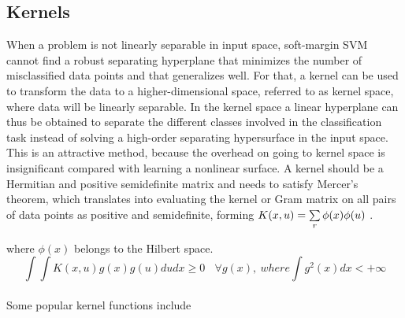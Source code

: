 \subsection{Kernels}

When a problem is not linearly separable in input space, soft-margin SVM cannot find a robust separating
hyperplane that minimizes the number of misclassified data points and that generalizes well. For that, a kernel can be used to transform the data to a higher-dimensional space, referred to as kernel space, where data will be linearly separable. In the kernel space a linear hyperplane can thus be obtained to separate the different classes involved in the classification task instead of solving a high-order separating hypersurface in the input space. This is an attractive method, because the overhead on going to kernel space is insignificant compared with learning a nonlinear surface. A kernel should be a Hermitian and positive semidefinite matrix and needs to satisfy Mercer’s theorem, which translates into evaluating the kernel or Gram matrix on all pairs of data points as positive and semidefinite, forming
\newline 
\newline
$K(\small{x,u})=\sum\limits_{r} \phi(x)\phi(u) $ .

where $\phi(x) $ belongs to the Hilbert space.
\newline
$$\int \int K(x,u) g(x) g(u) du dx \geq 0 \ \ \ \ \forall g(x) , \ where \int g^2(x) dx < +\infty$$
\\
\newline 
Some popular kernel functions include
\newline
\newline


